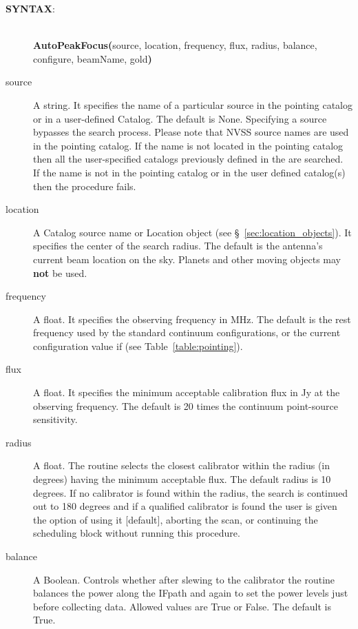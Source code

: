 \begin{description}
\item[{\bf SYNTAX}:]\ \\
{\bfseries{\textcolor{pythonKeywords}{AutoPeakFocus}}(}source, location,
frequency, flux, radius, balance, configure, beamName, gold{\bf)}

\item[source] A string. It specifies the name of a particular source in the 
pointing catalog or in a user-defined Catalog. The default is None. Specifying
a source bypasses the search process. Please note that NVSS source names
are used in the pointing catalog. If the name is not located in the pointing
catalog then all the user-specified catalogs previously defined in the
 are searched. If the name is not in the pointing catalog or in
the user defined catalog(s) then the procedure fails.  

\item[location] A Catalog source name or Location object (see
\S~\ref{sec:location_objects}). It specifies the center of the search
radius. The default is the antenna's current beam location on the sky.
Planets and other moving objects may {\bf not} be used.

\item[frequency] A float. It specifies the observing frequency in MHz. The 
default is the rest frequency used by the standard continuum configurations, 
or the current configuration value if 
(see Table~\ref{table:pointing}).

\item[flux] A float. It specifies the minimum acceptable calibration flux 
in Jy at the observing frequency. The default is 20 times the continuum 
point-source sensitivity.

\item[radius] A float. The routine selects the closest calibrator within the 
radius (in degrees) having the minimum acceptable flux. The default 
radius is 10 degrees. If no calibrator is found within the radius, the
search is continued out to 180 degrees and if a qualified calibrator is
found the user is given the option of using it [default], aborting the
scan, or continuing the scheduling block without running this procedure.

\item[balance] A Boolean. Controls whether after slewing to the calibrator 
the routine balances the power along the \gls{IFpath} and again to set the
power levels just before collecting data. Allowed values are True or False.
The default is True.


\end{description}
